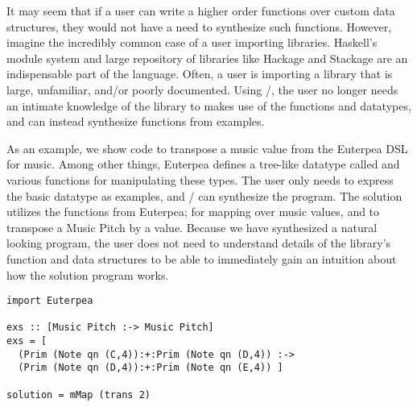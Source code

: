 It may seem that if a user can write a higher order functions over custom data structures, they would not have a need to synthesize such functions.
However, imagine the incredibly common case of a user importing libraries.
Haskell's module system and large repository of libraries like Hackage and Stackage are an indispensable part of the language\cite{hackage,stackage}.
Often, a user is importing a library that is large, unfamiliar, and/or poorly documented.
Using \ourTool/, the user no longer needs an intimate knowledge of the library to makes use of the functions and datatypes, and can instead synthesize functions from examples.

As an example, we show code to transpose a music value from the Euterpea DSL for music\cite{euterpea}.
Among other things, Euterpea defines a tree-like datatype called  and various functions for manipulating these types.
The user only needs to express the basic datatype as examples, and \ourTool/ can synthesize the  program.
The solution utilizes the functions from Euterpea;  for mapping over music values, and  to transpose a Music Pitch by a value.
Because we have synthesized a natural looking program, the user does not need to understand details of the library's function and data structures to be able to immediately gain an intuition about how the solution program works.

\begin{lstlisting}
import Euterpea

exs :: [Music Pitch :-> Music Pitch]
exs = [
  (Prim (Note qn (C,4)):+:Prim (Note qn (D,4)) :->
  (Prim (Note qn (D,4)):+:Prim (Note qn (E,4)) ]
        
solution = mMap (trans 2)
\end{lstlisting}


